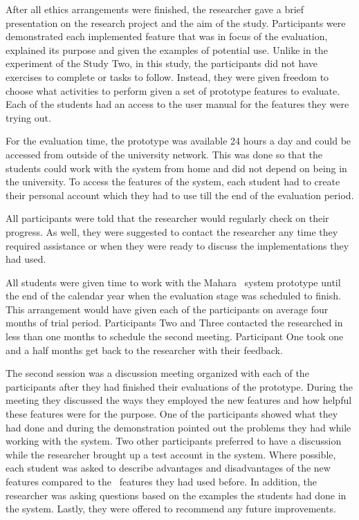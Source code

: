 After all ethics arrangements were finished, the researcher gave a brief
presentation on the research project and the aim of the study. Participants were
demonstrated each implemented feature that was in focus of the evaluation,
explained its purpose and given the examples of potential use. Unlike in the
experiment of the Study Two, in this study, the participants did not have
exercises to complete or tasks to follow. Instead, they were given freedom to
choose what activities to perform given a set of prototype features to evaluate.
Each of the students had an access to the user manual for the features they were
trying out. 

For the evaluation time, the prototype was available 24 hours a day and could be
accessed from outside of the university network. This was done so that the
students could work with the system from home and did not depend on being in the
university. To access the features of the system, each student had to create
their personal account which they had to use till the end of the evaluation
period.

All participants were told that the researcher would regularly check on their
progress. As well, they were suggested to contact the researcher any time they
required assistance or when they were ready to discuss the implementations they
had used.

All students were given time to work with the Mahara \ep~system prototype until
the end of the calendar year when the evaluation stage was scheduled to finish.
This arrangement would have given each of the participants on average four
months of trial period. Participants Two and Three contacted the researched in
less than one months to schedule the second meeting. Participant One took one
and a half months get back to the researcher with their feedback.

The second session was a discussion meeting organized with each of the
participants after they had finished their evaluations of the prototype. During
the meeting they discussed the ways they employed the new features and how
helpful these features were for the purpose. One of the participants showed
what they had done and during the demonstration pointed out the problems they
had while working with the system. Two other participants preferred to have a
discussion while the researcher brought up a test account in the system. Where
possible, each student was asked to describe advantages and disadvantages of the
new features compared to the \ep~features they had used before. In addition, the
researcher was asking questions based on the examples the students had done in
the system. Lastly, they were offered to recommend any future improvements.

